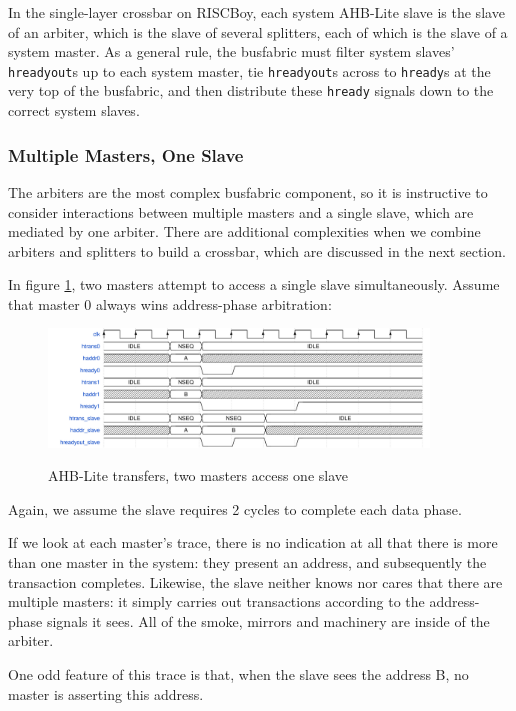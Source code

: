 \documentclass[notitlepage]{article}
\begin{document}
In the single-layer crossbar on RISCBoy, each system AHB-Lite slave is the slave of an arbiter, which is the slave of several splitters, each of which is the slave of a system master. As a general rule, the busfabric must filter system slaves' \texttt{hreadyout}s up to each system master, tie \texttt{hreadyout}s across to \texttt{hready}s at the very top of the busfabric, and then distribute these \texttt{hready} signals down to the correct system slaves.

\subsubsection{Multiple Masters, One Slave}

The arbiters are the most complex busfabric component, so it is instructive to consider interactions between multiple masters and a single slave, which are mediated by one arbiter. There are additional complexities when we combine arbiters and splitters to build a crossbar, which are discussed in the next section.

In figure \ref{diagram:ahbl_mm_simult1}, two masters attempt to access a single slave simultaneously. Assume that master 0 always wins address-phase arbitration:

\begin{figure}[H]
\centering
\caption{AHB-Lite transfers, two masters access one slave}
\includegraphics[width=0.9\textwidth]{waves/ahbl_mm_simult1.pdf}
\label{diagram:ahbl_mm_simult1}
\end{figure}

Again, we assume the slave requires 2 cycles to complete each data phase.

If we look at each master's trace, there is no indication at all that there is more than one master in the system: they present an address, and subsequently the transaction completes. Likewise, the slave neither knows nor cares that there are multiple masters: it simply carries out transactions according to the address-phase signals it sees. All of the smoke, mirrors and machinery are inside of the arbiter.

One odd feature of this trace is that, when the slave sees the address B, no master is asserting this address.
\end{document}

